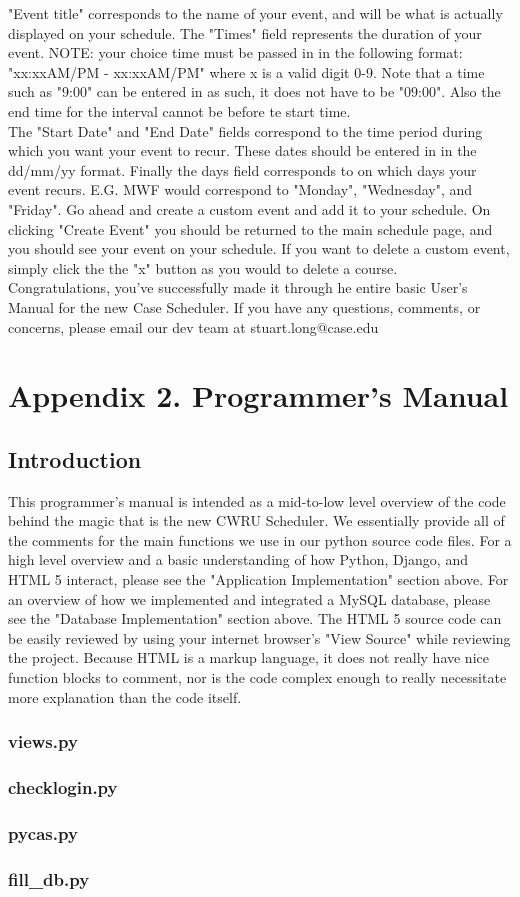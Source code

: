 \documentclass[pdftex,12pt,letter]{article}
\begin{document}
"Event title" corresponds to the name of your event, and will be what is actually displayed on your schedule. The "Times" field represents the duration of your event. NOTE: your choice time must be passed in in the following format: "xx:xxAM/PM - xx:xxAM/PM" where x is a valid digit 0-9. Note that a time such as "9:00" can be entered in as such, it does not have to be "09:00". Also the end time for the interval cannot be before te start time.\\

The "Start Date" and "End Date" fields correspond to the time period during which you want your event to recur. These dates should be entered in in the dd/mm/yy format. Finally the days field corresponds to on which days your event recurs. E.G. MWF would correspond to "Monday", "Wednesday", and "Friday". Go ahead and create a custom event and add it to your schedule. On clicking "Create Event" you should be returned to the main schedule page, and you should see your event on your schedule. If you want to delete a custom event, simply click the the "x" button as you would to delete a course.\\

Congratulations, you've successfully made it through he entire basic User's Manual for the new Case Scheduler. If you have any questions, comments, or concerns, please email our dev team at stuart.long@case.edu

\section{Appendix 2. Programmer's Manual}
\subsection{Introduction}
This programmer's manual is intended as a mid-to-low level overview of the code behind the magic that is the new CWRU Scheduler. We essentially provide all of the comments for the main functions we use in our python source code files. For a high level overview and a basic understanding of how Python, Django, and HTML 5 interact, please see the "Application Implementation" section above. For an overview of how we implemented and integrated a MySQL database, please see the "Database Implementation" section above. The HTML 5 source code can be easily reviewed by using your internet browser's "View Source" while reviewing the project. Because HTML is a markup language, it does not really have nice function blocks to comment, nor is the code complex enough to really necessitate more explanation than the code itself.
\subsubsection*{views.py}

\subsubsection*{checklogin.py}

\subsubsection*{pycas.py}

\subsubsection*{fill\_db.py}

\end{document}
